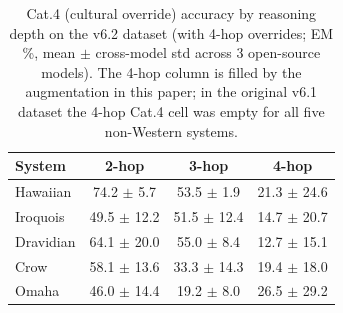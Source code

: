 \begin{table}[t]
\centering
\caption{Cat.4 (cultural override) accuracy by reasoning depth on the v6.2 dataset (with 4-hop overrides; EM \%, mean $\pm$ cross-model std across 3 open-source models). The 4-hop column is filled by the augmentation in this paper; in the original v6.1 dataset the 4-hop Cat.4 cell was empty for all five non-Western systems.}
\label{tab:cat4_4hop}
\small
\begin{tabular}{lccc}
\toprule
\textbf{System} & \textbf{2-hop} & \textbf{3-hop} & \textbf{4-hop} \\
\midrule
Hawaiian & 74.2 $\pm$ 5.7 & 53.5 $\pm$ 1.9 & 21.3 $\pm$ 24.6 \\
Iroquois & 49.5 $\pm$ 12.2 & 51.5 $\pm$ 12.4 & 14.7 $\pm$ 20.7 \\
Dravidian & 64.1 $\pm$ 20.0 & 55.0 $\pm$ 8.4 & 12.7 $\pm$ 15.1 \\
Crow & 58.1 $\pm$ 13.6 & 33.3 $\pm$ 14.3 & 19.4 $\pm$ 18.0 \\
Omaha & 46.0 $\pm$ 14.4 & 19.2 $\pm$ 8.0 & 26.5 $\pm$ 29.2 \\
\bottomrule
\end{tabular}
\end{table}
